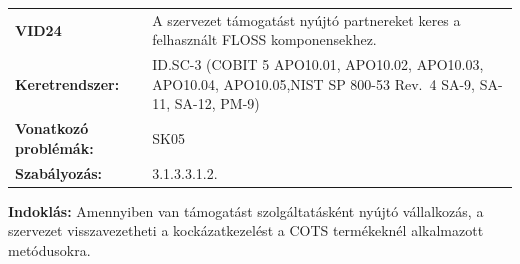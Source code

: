\documentclass[12pt,magyar,a4paper,oneside]{scrreprt}
\begin{document}
\begin{longtable}[]{@{}ll@{}}
\toprule
\endhead
\begin{minipage}[t]{0.16\columnwidth}\raggedright
\textbf{VID24}\strut
\end{minipage} & \begin{minipage}[t]{0.79\columnwidth}\raggedright
A szervezet támogatást nyújtó partnereket keres a felhasznált FLOSS
komponensekhez.\strut
\end{minipage}\tabularnewline
\begin{minipage}[t]{0.16\columnwidth}\raggedright
\textbf{Keretrendszer:}\strut
\end{minipage} & \begin{minipage}[t]{0.79\columnwidth}\raggedright
ID.SC-3 (COBIT 5 APO10.01, APO10.02, APO10.03, APO10.04, APO10.05,NIST
SP 800-53 Rev.~4 SA-9, SA-11, SA-12, PM-9)\strut
\end{minipage}\tabularnewline
\begin{minipage}[t]{0.16\columnwidth}\raggedright
\textbf{Vonatkozó problémák:}\strut
\end{minipage} & \begin{minipage}[t]{0.79\columnwidth}\raggedright
SK05\strut
\end{minipage}\tabularnewline
\begin{minipage}[t]{0.16\columnwidth}\raggedright
\textbf{Szabályozás:}\strut
\end{minipage} & \begin{minipage}[t]{0.79\columnwidth}\raggedright
3.1.3.3.1.2.\strut
\end{minipage}\tabularnewline
\bottomrule
\end{longtable}

\textbf{Indoklás: } Amennyiben van támogatást szolgáltatásként nyújtó
vállalkozás, a szervezet visszavezetheti a kockázatkezelést a COTS
termékeknél alkalmazott metódusokra.
\end{document}
